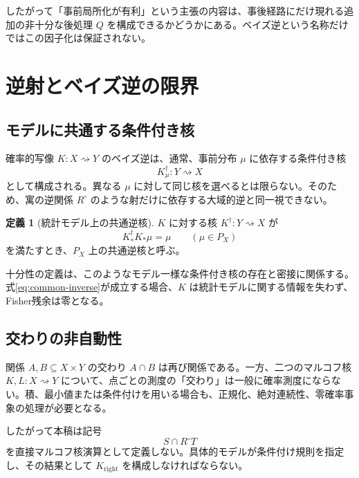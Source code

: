 \documentclass[a4paper,11pt]{ltjsarticle}
\theoremstyle{definition}
\newtheorem{definition}{定義}[section]
\theoremstyle{plain}
\begin{document}
したがって「事前局所化が有利」という主張の内容は、事後経路にだけ現れる追加の非十分な後処理 $Q$ を構成できるかどうかにある。ベイズ逆という名称だけではこの因子化は保証されない。

\section{逆射とベイズ逆の限界}

\subsection{モデルに共通する条件付き核}

確率的写像 $K:X\rightsquigarrow Y$ のベイズ逆は、通常、事前分布 $\mu$ に依存する条件付き核
\begin{equation}
 K_\mu^\dagger:Y\rightsquigarrow X
\end{equation}
として構成される。異なる $\mu$ に対して同じ核を選べるとは限らない。そのため、寓の逆関係 $R^\circ$ のような射だけに依存する大域的逆と同一視できない。

\begin{definition}[統計モデル上の共通逆核]
$K$ に対する核 $K^\dagger:Y\rightsquigarrow X$ が
\begin{equation}
 K^\dagger_*K_*\mu=\mu
 \qquad(\mu\in P_X)
 \label{eq:common-inverse}
\end{equation}
を満たすとき、$P_X$ 上の共通逆核と呼ぶ。
\end{definition}

十分性の定義は、このようなモデル一様な条件付き核の存在と密接に関係する\cite{JostLeLuuTran2019,Le2020DiffeologicalStatistics}。式\eqref{eq:common-inverse}が成立する場合、$K$ は統計モデルに関する情報を失わず、Fisher残余は零となる。

\subsection{交わりの非自動性}

関係 $A,B\subseteq X\times Y$ の交わり $A\cap B$ は再び関係である。一方、二つのマルコフ核 $K,L:X\rightsquigarrow Y$ について、点ごとの測度の「交わり」は一般に確率測度にならない。積、最小値または条件付けを用いる場合も、正規化、絶対連続性、零確率事象の処理が必要となる。

したがって本稿は記号
\begin{equation}
 S\cap R^\circ T
\end{equation}
を直接マルコフ核演算として定義しない。具体的モデルが条件付け規則を指定し、その結果として $K_{\mathrm{right}}$ を構成しなければならない。
\end{document}
